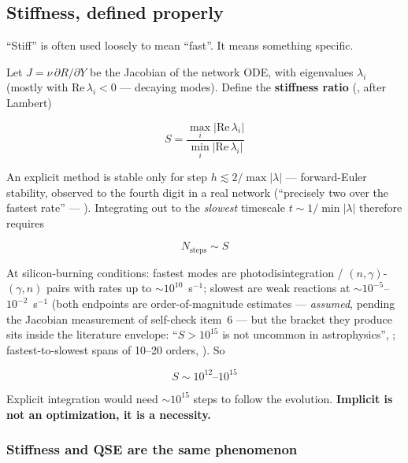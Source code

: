 \subsection{Stiffness, defined properly}
\label{sec:stiffness}

``Stiff'' is often used loosely to mean ``fast''. It means something specific.

Let $J = \nu\,\partial R/\partial Y$ be the Jacobian of the network ODE, with
eigenvalues $\lambda_i$ (mostly with $\mathrm{Re}\,\lambda_i < 0$ --- decaying
modes). Define the \textbf{stiffness ratio} (\citealt{hix1999b}, after Lambert)

\begin{equation}
S = \frac{\max_i |\mathrm{Re}\,\lambda_i|}{\min_i |\mathrm{Re}\,\lambda_i|}
\label{eq:stiffness-ratio}
\end{equation}

An explicit method is stable only for step $h \lesssim 2/\max|\lambda|$ ---
forward-Euler stability, observed to the fourth digit in a real network
(``precisely two over the fastest rate'' --- \citealt{guidry2013}). Integrating
out to the \emph{slowest} timescale $t \sim 1/\min|\lambda|$ therefore requires

\begin{equation*}
N_{\text{steps}} \sim S
\end{equation*}

At silicon-burning conditions: fastest modes are photodisintegration /
$(n,\gamma)$-$(\gamma,n)$ pairs with rates up to ${\sim}10^{10}$~s$^{-1}$;
slowest are weak reactions at ${\sim}10^{-5}$--$10^{-2}$~s$^{-1}$ (both
endpoints are order-of-magnitude estimates --- \emph{assumed}, pending the
Jacobian measurement of self-check item~6 --- but the bracket they produce sits
inside the literature envelope: ``$S > 10^{15}$ is not uncommon in
astrophysics'', \citealt{hix1999b}; fastest-to-slowest spans of 10--20 orders,
\citealt{guidry2013}). So

\begin{equation*}
S \sim 10^{12}\text{--}10^{15}
\end{equation*}

Explicit integration would need ${\sim}10^{15}$ steps to follow the \Ye{}
evolution. \textbf{Implicit is not an optimization, it is a necessity.}

\subsubsection{Stiffness and QSE are the same phenomenon}
\label{sec:stiffnessqse}

